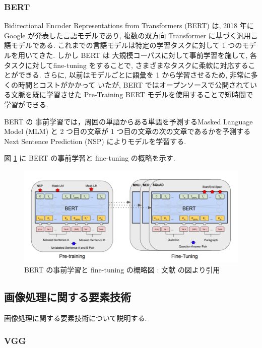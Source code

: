\newpage
\changeindent{0cm}
\subsubsection{BERT}
\changeindent{2cm}
Bidirectional Encoder Representations from Transformers (BERT) \cite{devlin2018bert} は, 2018 年に
Google が発表した言語モデルであり, 複数の双方向 Transformer に基づく汎用言語モデルである.
これまでの言語モデルは特定の学習タスクに対して 1 つのモデルを用いてきた. しかし BERT は
大規模コーパスに対して事前学習を施して, 各タスクに対してfine-tuning をすることで,
さまざまなタスクに柔軟に対応することができる. さらに, 以前はモデルごとに語彙を 1 から学習させるため, 非常に多くの時間とコストがかかって
いたが, BERT ではオープンソースで公開されている文脈を既に学習させた Pre-Training BERT モデルを使用することで短時間で学習ができる.

BERT の 事前学習では，周囲の単語からある単語を予測するMasked Language Model (MLM)
と 2 つ目の文章が 1 つ目の文章の次の文章であるかを予測する Next Sentence Prediction (NSP) によりモデルを学習する.

図 \ref{fig:bert_pre} に BERT の事前学習と fine-tuning の概略を示す.

\begin{figure}[h]
  \begin{center}
    \includegraphics[width=0.8\hsize]{doc/figures/bert_pre.png}
    \caption{BERT の事前学習と fine-tuning の概略図 : 文献 \cite{devlin2018bert} の図より引用}
    \label{fig:bert_pre}
  \end{center}
\end{figure}

\newpage
\changeindent{0cm}
\subsection{画像処理に関する要素技術}
\changeindent{2cm}

画像処理に関する要素技術について説明する.

\changeindent{0cm}
\subsubsection{VGG}
\changeindent{2cm}

